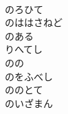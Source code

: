 \documentclass[10pt,b5j]{tarticle} %
\begin{document}
\begin{enumerate}
\begin{minipage}[c]{\blocksize}
        \vspace{\linespace}
        \item~\\
        のろひて\\
        のははさねど\\
        のある\\
        りへてし\\
        のの\\
        のをふべし\\
        ののとて\\
        のいざまん
    
    \end{minipage}
\end{enumerate} %
\end{document}
